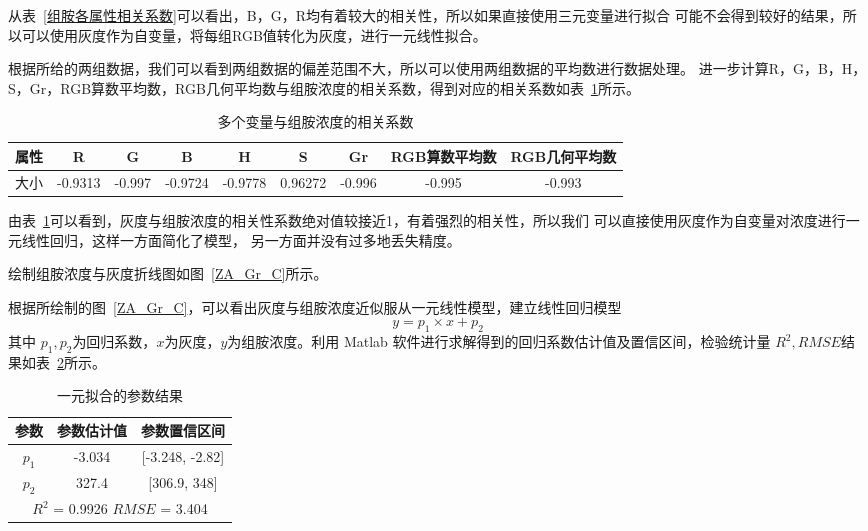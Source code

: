     从表~\ref{组胺各属性相关系数}可以看出，B，G，R均有着较大的相关性，所以如果直接使用三元变量进行拟合
    可能不会得到较好的结果，所以可以使用灰度作为自变量，将每组RGB值转化为灰度，进行一元线性拟合。

    根据所给的两组数据，我们可以看到两组数据的偏差范围不大，所以可以使用两组数据的平均数进行数据处理。
    进一步计算R，G，B，H，S，Gr，RGB算数平均数，RGB几何平均数与组胺浓度的相关系数，得到对应的相关系数如表~\ref{ZuAnCov}所示。
    \begin{table}[H]
        \centering
        \caption{多个变量与组胺浓度的相关系数}
        \label{ZuAnCov}
        \begin{tabular}{@{}ccccccccc@{}}
        \toprule
        属性 & R       & G      & B       & H       & S       &  Gr    & RGB算数平均数 & RGB几何平均数 \\ \midrule
        大小 & -0.9313 & -0.997 & -0.9724 & -0.9778 & 0.96272 & -0.996 & -0.995   & -0.993   \\ \bottomrule
        \end{tabular}
        \end{table}
         
    由表~\ref{ZuAnCov}可以看到，灰度与组胺浓度的相关性系数绝对值较接近1，有着强烈的相关性，所以我们
    可以直接使用灰度作为自变量对浓度进行一元线性回归，这样一方面简化了模型，
    另一方面并没有过多地丢失精度。

    绘制组胺浓度与灰度折线图如图~\ref{ZA_Gr_C}所示。


    根据所绘制的图~\ref{ZA_Gr_C}，可以看出灰度与组胺浓度近似服从一元线性模型，建立线性回归模型
    $$ y = p_1 \times x + p_2$$
    其中 $p_{1}, p_{2}$为回归系数，$x$为灰度，$y$为组胺浓度。利用 Matlab 软件进行求解得到的回归系数估计值及置信区间，检验统计量 $R^2, RMSE $结果如表~\ref{ZuAnLinear}所示。

    \begin{table}[H]
        \centering
        \caption{一元拟合的参数结果}
        \label{ZuAnLinear}
        \begin{tabular}{@{}ccc@{}}
        \toprule
        参数         & 参数估计值      & 参数置信区间                  \\ \midrule
        $p_1$      & -3.034     & {[}-3.248, -2.82{]}     \\
        $p_2$      & 327.4      & {[}306.9, 348{]}     \\
        \hline
        \multicolumn{3}{c}{$R^2$ = 0.9926 $RMSE$ = 3.404} \\ \bottomrule
        \end{tabular}
        \end{table}

